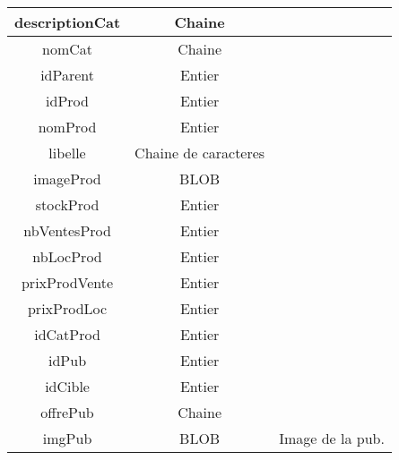 \documentclass{report}
\begin{document}
\begin{tabular}{|c|c|c|}
\hline
descriptionCat & Chaine & \\
\hline
nomCat & Chaine & \\
\hline
idParent & Entier & \\
\hline
idProd & Entier & \\
\hline
nomProd & Entier & \\
\hline
libelle & Chaine de caracteres & \\
\hline
imageProd & BLOB & \\
\hline
stockProd & Entier & \\
\hline
nbVentesProd & Entier & \\
\hline
nbLocProd & Entier & \\
\hline
prixProdVente & Entier & \\
\hline
prixProdLoc & Entier & \\
\hline
idCatProd & Entier & \\
\hline
idPub & Entier & \\
\hline
idCible & Entier & \\
\hline
offrePub & Chaine & \\
\hline
imgPub & BLOB & Image de la pub.\\
\hline

\end{tabular}
\end{document}
